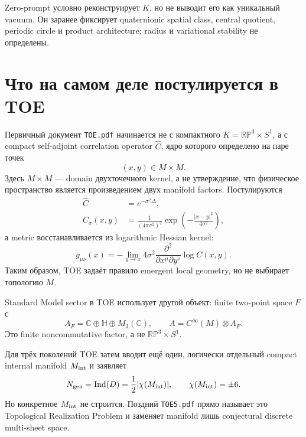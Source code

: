 \begin{theorem}
Zero-prompt условно реконструирует \(K\), но не выводит его как уникальный
vacuum. Он заранее фиксирует quaternionic spatial class, central quotient,
periodic circle и product architecture; radius и variational stability не
определены.
\end{theorem}

\section{Что на самом деле постулируется в TOE}

Первичный документ \texttt{TOE.pdf} начинается не с компактного
\(K=\mathbb{RP}^3\times S^1\), а с compact self-adjoint correlation
operator \(\widehat C\), ядро которого определено на паре точек
\begin{equation}
 (x,y)\in M\times M.
\end{equation}
Здесь \(M\times M\) --- domain двухточечного kernel, а не утверждение, что
физическое пространство является произведением двух manifold factors.
Постулируются
\begin{align}
 \widehat C&=e^{-\sigma^2\Delta},
 \\
 C_\sigma(x,y)
 &=\frac1{(4\pi\sigma^2)^2}
 \exp\left(-\frac{|x-y|^2}{4\sigma^2}\right),
\end{align}
а metric восстанавливается из logarithmic Hessian kernel:
\begin{equation}
 g_{\mu\nu}(x)
 =-\lim_{y\to x}4\sigma^2
 \frac{\partial^2}{\partial x^\mu\partial y^\nu}
 \log C(x,y).
\end{equation}
Таким образом, TOE задаёт правило emergent local geometry, но не выбирает
топологию \(M\).

Standard Model sector в TOE использует другой объект: finite two-point
space \(F\) с
\begin{equation}
 A_F=\mathbb C\oplus\mathbb H\oplus M_3(\mathbb C),
 \qquad
 A=C^\infty(M)\otimes A_F.
\end{equation}
Это finite noncommutative factor, а не \(\mathbb{RP}^3\times S^1\).

Для трёх поколений TOE затем вводит ещё один, логически отдельный compact
internal manifold \(M_{\rm int}\) и заявляет
\begin{equation}
 N_{\rm gen}=\operatorname{Ind}(D)
 =\frac12|\chi(M_{\rm int})|,
 \qquad
 \chi(M_{\rm int})=\pm6.
\end{equation}
Но конкретное \(M_{\rm int}\) не строится. Поздний \texttt{TOE5.pdf}
прямо называет это Topological Realization Problem и заменяет manifold
лишь conjectural discrete multi-sheet space.

